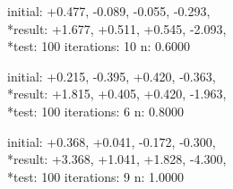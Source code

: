 initial: +0.477, -0.089, -0.055, -0.293, 
\\*result:  +1.677, +0.511, +0.545, -2.093, 
\\*test: 100  iterations: 10	n: 0.6000

initial: +0.215, -0.395, +0.420, -0.363, 
\\*result:  +1.815, +0.405, +0.420, -1.963, 
\\*test: 100  iterations: 6	n: 0.8000

initial: +0.368, +0.041, -0.172, -0.300, 
\\*result:  +3.368, +1.041, +1.828, -4.300, 
\\*test: 100  iterations: 9	n: 1.0000
